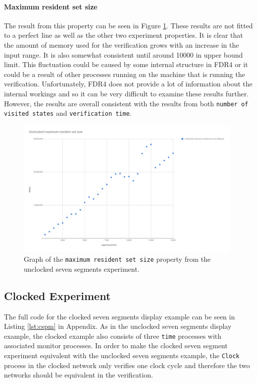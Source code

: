 \paragraph{Maximum resident set size}
The result from this property can be seen in Figure \ref{fig:unclocked_resident_size}. These results are not fitted to a perfect line as well as the other two experiment properties. It is clear that the amount of memory used for the verification grows with an increase in the input range. It is also somewhat consistent until around 10000 in upper bound limit. This fluctuation could be caused by some internal structure in FDR4 or it could be a result of other processes running on the machine that is running the verification. Unfortunately, FDR4 does not provide a lot of information about the internal workings and so it can be very difficult to examine these results further. However, the results are overall consistent with the results from both \texttt{number of visited states} and \texttt{verification time}.
\begin{figure}
    \includegraphics[width=0.98\textwidth]{./figures/temporary_figures/unclocked_maximum_resident_set_size.jpg}
\caption{Graph of the \texttt{maximum resident set size} property from the unclocked seven segments experiment.}
\label{fig:unclocked_resident_size}
\end{figure}

\subsection{Clocked Experiment}
The full code for the clocked seven segments display example can be seen in Listing \ref{lst:cspm} in Appendix. %
As in the unclocked seven segments display example, the clocked example also consists of three \texttt{time} processes with associated monitor processes.
In order to make the clocked seven segment experiment equivalent with the unclocked seven segments example, the \texttt{Clock} process in the clocked network only verifies one clock cycle and therefore the two networks should be equivalent in the verification.
